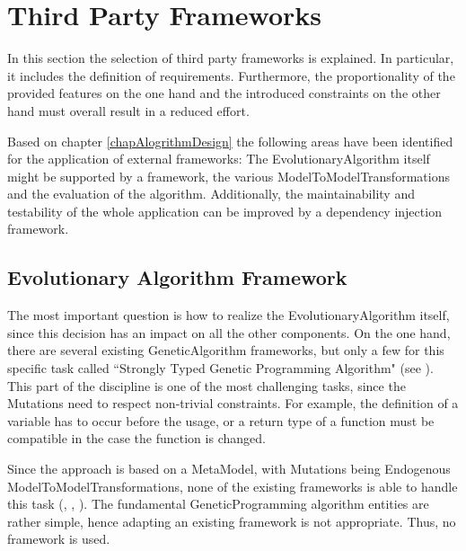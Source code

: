 	

\section{Third Party Frameworks}\label{secThirdPartyFrameworks}

In this section the selection of third party frameworks is explained. In particular, it includes the definition of requirements. Furthermore, the proportionality of the provided features on the one hand and the introduced constraints on the other hand must overall result in a reduced effort.

Based on chapter \ref{chapAlogrithmDesign} the following areas have been identified for the application of external frameworks: The \gls{EvolutionaryAlgorithm} itself might be supported by a framework, the various \glspl{ModelToModelTransformation} and the evaluation of the algorithm. Additionally, the maintainability and testability of the whole application can be improved by a dependency injection framework.

\subsection{Evolutionary Algorithm Framework}
\label{subsecEvolutionaryAlgorithmFramework}
The most important question is how to realize the \gls{EvolutionaryAlgorithm} itself, since this decision has an impact on all the other components. On the one hand, there are several existing \gls{GeneticAlgorithm} frameworks, but only a few for this specific task called ``Strongly Typed Genetic Programming Algorithm" (see \cite{Montana2002}). This part of the discipline is one of the most challenging tasks, since the \glspl{Mutation} need to respect non-trivial constraints. For example, the definition of a variable has to occur before the usage, or a return type of a function must be compatible in the case the function is changed.

Since the approach is based on a \gls{MetaModel}, with \glspl{Mutation} being \gls{Endogenous} \glspl{ModelToModelTransformation}, none of the existing frameworks is able to handle this task (\cite{McDermott}, \cite{Meffert}, \cite{Lukasiewycz}). The fundamental \gls{GeneticProgramming} algorithm entities are rather simple, hence adapting an existing framework is not appropriate. Thus, no framework is used. %

